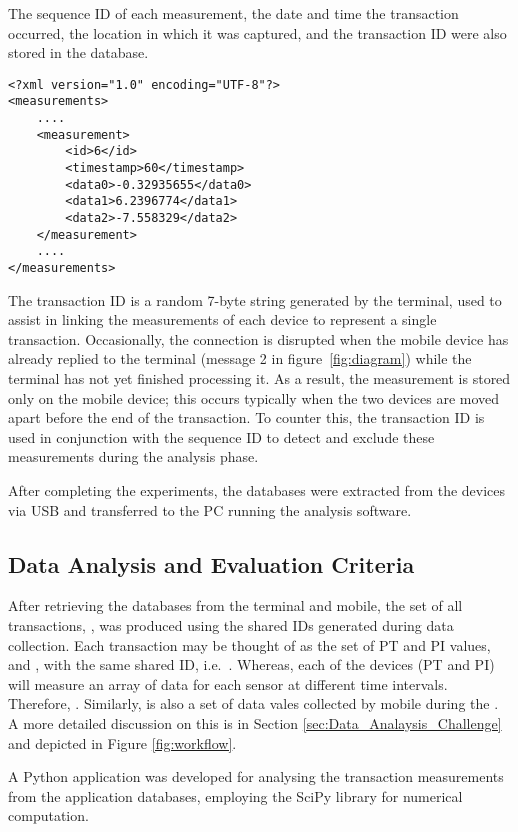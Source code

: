 \documentclass{article}
\begin{document}
The sequence ID of each measurement, the date and time the transaction occurred, the location in which it was captured, and the transaction ID were also stored in the database.

\begin{lstlisting}[style=listXML, caption={Sample XML Record}, label={lst:xml}, float, floatplacement=H]
<?xml version="1.0" encoding="UTF-8"?>
<measurements>
	....
	<measurement>
		<id>6</id>
		<timestamp>60</timestamp>
		<data0>-0.32935655</data0>
		<data1>6.2396774</data1>
		<data2>-7.558329</data2>
	</measurement>
	....
</measurements>
\end{lstlisting}

The transaction ID is a random 7-byte string generated by the terminal, used to assist in linking the measurements of each device to represent a single transaction.
Occasionally, the connection is disrupted when the mobile device has already replied to the terminal (message 2 in figure~\ref{fig:diagram}) while the terminal has not yet finished processing it.  As a result, the measurement is stored only on the mobile device; this occurs typically when the two devices are moved apart before the end of the transaction.  To counter this, the transaction ID is used in conjunction with the sequence ID to detect and exclude these measurements during the analysis phase.



After completing the experiments, the databases were extracted from the devices via USB and transferred to the PC running the analysis software.

\subsection{Data Analysis and Evaluation Criteria}
\label{sec:DataAnalysisandEvaluationCriteria}

After retrieving the databases from the terminal and mobile, the set of all transactions, , was produced using the shared IDs generated during data collection.  Each transaction may be thought of as the set of PT and PI values,  and , with the same shared ID, i.e.\ . Whereas, each of the devices (PT and PI) will measure an array of data for each sensor at different time intervals. Therefore, . Similarly,  is also a set of data vales collected by mobile during the . A more detailed discussion on this is in Section \ref{sec:Data_Analaysis_Challenge} and depicted in Figure \ref{fig:workflow}.

A Python application was developed for analysing the transaction measurements from the application databases, employing the SciPy library \cite{scipy} for numerical computation.
\end{document}
